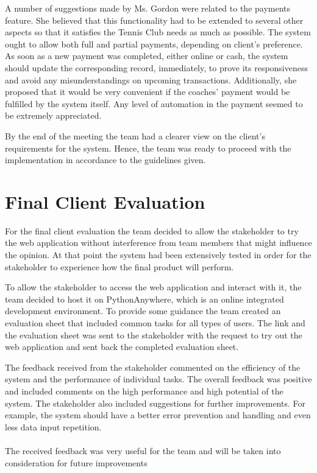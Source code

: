 \documentclass{l3proj}
\begin{document}
\par 
A number of suggestions made by Ms. Gordon were related to the payments feature. She believed that this functionality had to be extended to several other aspects so that it satisfies the Tennis Club needs as much as possible. The system ought to allow both full and partial payments, depending on client's preference. As soon as a new payment was completed, either online or cash, the system should update the corresponding record, immediately, to prove its responsiveness and avoid any misunderstandings on upcoming transactions. Additionally, she proposed that it would be very convenient if the coaches' payment would be fulfilled by the system itself. Any level of automation in the payment seemed to be extremely appreciated.\\
\par 
By the end of the meeting the team had a clearer view on the client’s requirements for the system. Hence, the team was ready to proceed with the implementation in accordance to the guidelines given.




\section{Final Client Evaluation}
For the final client evaluation the team decided to allow the stakeholder to try the web application without interference from team members that might influence the opinion. At that point the system had been extensively tested in order for the stakeholder to experience how the final product will perform.\\
\par 
To allow the stakeholder to access the web application and interact with it, the team decided to host it on PythonAnywhere, which is an online integrated development environment. To provide some guidance the team created an evaluation sheet that included common tasks for all types of users. The link and the evaluation sheet was sent to the stakeholder with the request to try out the web application and sent back the completed evaluation sheet.\\
\par 
The feedback received from the stakeholder commented on the efficiency of the system and the performance of individual tasks. The overall feedback was positive and included comments on the high performance and high potential of the system. The stakeholder also included suggestions for further improvements. For example, the system should have a better error prevention and handling and even less data input repetition.\\
\\
The received feedback was very useful for the team and will be taken into consideration for future improvements 
\end{document}
